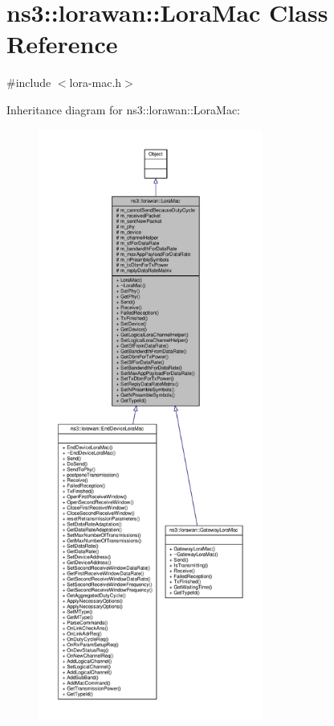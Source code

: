 \hypertarget{classns3_1_1lorawan_1_1LoraMac}{}\section{ns3\+:\+:lorawan\+:\+:Lora\+Mac Class Reference}
\label{classns3_1_1lorawan_1_1LoraMac}


{\ttfamily \#include $<$lora-\/mac.\+h$>$}



Inheritance diagram for ns3\+:\+:lorawan\+:\+:Lora\+Mac\+:
\nopagebreak
\begin{figure}[H]
\begin{center}
\leavevmode
\includegraphics[height=550pt]{classns3_1_1lorawan_1_1LoraMac__inherit__graph}
\end{center}
\end{figure}


